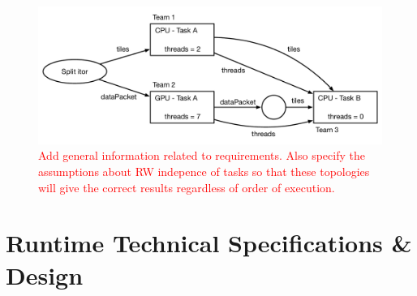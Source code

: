 \documentclass{article}
\begin{document}
\begin{figure}[!ht]
\begin{center}
\includegraphics[width=5.0in]{WorkSplittingExample.pdf}
\caption[]{\textcolor{red}{Add general information related to requirements.
Also specify the assumptions about RW indepence of tasks so that these
topologies will give the correct results regardless of order of execution.}}
\label{fig:SplitItor}
\end{center}
\end{figure}

\section{Runtime Technical Specifications \& Design}
\end{document}
